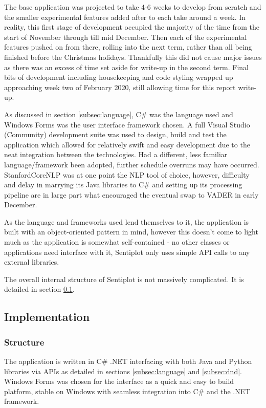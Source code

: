 \documentclass{article}
\begin{document}
{        The base application was projected to take 4-6 weeks to develop from scratch and the smaller experimental features added after to each take around a week. In reality, this first stage of development occupied the majority of the time from the start of November through till mid December. Then each of the experimental features pushed on from there, rolling into the next term, rather than all being finished before the Christmas holidays. Thankfully this did not cause major issues as there was an excess of time set aside for write-up in the second term. Final bits of development including housekeeping and code styling wrapped up approaching week two of February 2020, still allowing time for this report write-up.

        As discussed in section \ref{subsec:language}, C\# was the language used and Windows Forms was the user interface framework chosen. A full Visual Studio (Community) development suite was used to design, build and test the application which allowed for relatively swift and easy development due to the neat integration between the technologies. Had a different, less familiar language/framework been adopted, further schedule overruns may have occurred. StanfordCoreNLP was at one point the NLP tool of choice, however, difficulty and delay in marrying its Java libraries to C\# and setting up its processing pipeline are in large part what encouraged the eventual swap to VADER in early December.
        
        As the language and frameworks used lend themselves to it, the application is built with an object-oriented pattern in mind, however this doesn't come to light much as the application is somewhat self-contained - no other classes or applications need interface with it, Sentiplot only uses simple API calls to any external libraries.

        The overall internal structure of Sentiplot is not massively complicated. It is detailed in section \ref{subsec:implementation}.
    \subsection{Implementation}
    \label{subsec:implementation}
        \subsubsection{Structure}
            The application is written in C\# .NET interfacing with both Java and Python libraries via APIs as detailed in sections \ref{subsec:language} and \ref{subsec:dnd}. Windows Forms was chosen for the interface as a quick and easy to build platform, stable on Windows with seamless integration into C\# and the .NET framework.

}
\end{document}
